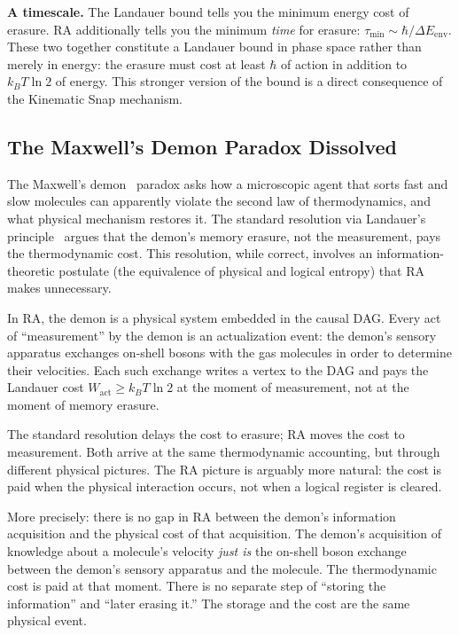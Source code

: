 \documentclass[11pt,a4paper]{article}
\theoremstyle{plain}
\theoremstyle{definition}
\theoremstyle{remark}
\begin{document}
\textbf{A timescale.} The Landauer bound tells you the minimum energy cost of
erasure. RA additionally tells you the minimum \emph{time} for erasure:
$\tau_{\mathrm{min}} \sim \hbar / \Delta E_{\mathrm{env}}$. These two together
constitute a Landauer bound in phase space rather than merely in energy: the
erasure must cost at least $\hbar$ of action in addition to $k_B T \ln 2$ of
energy. This stronger version of the bound is a direct consequence of the
Kinematic Snap mechanism.

\subsection{The Maxwell's Demon Paradox Dissolved}

The Maxwell's demon~\citep{Maxwell1872} paradox asks how a microscopic agent that
sorts fast and slow molecules can apparently violate the second law of
thermodynamics, and what physical mechanism restores it. The standard resolution
via Landauer's principle~\citep{Bennett1982} argues that the demon's memory
erasure, not the measurement, pays the thermodynamic cost. This resolution, while
correct, involves an information-theoretic postulate (the equivalence of physical
and logical entropy) that RA makes unnecessary.

In RA, the demon is a physical system embedded in the causal DAG. Every act of
``measurement'' by the demon is an actualization event: the demon's sensory
apparatus exchanges on-shell bosons with the gas molecules in order to determine
their velocities. Each such exchange writes a vertex to the DAG and pays the
Landauer cost $W_{\mathrm{act}} \geq k_B T \ln 2$ at the moment of measurement,
not at the moment of memory erasure.

The standard resolution delays the cost to erasure; RA moves the cost to
measurement. Both arrive at the same thermodynamic accounting, but through
different physical pictures. The RA picture is arguably more natural: the cost is
paid when the physical interaction occurs, not when a logical register is cleared.

More precisely: there is no gap in RA between the demon's information acquisition
and the physical cost of that acquisition. The demon's acquisition of knowledge
about a molecule's velocity \emph{just is} the on-shell boson exchange between the
demon's sensory apparatus and the molecule. The thermodynamic cost is paid at that
moment. There is no separate step of ``storing the information'' and ``later
erasing it.'' The storage and the cost are the same physical event.
\end{document}
